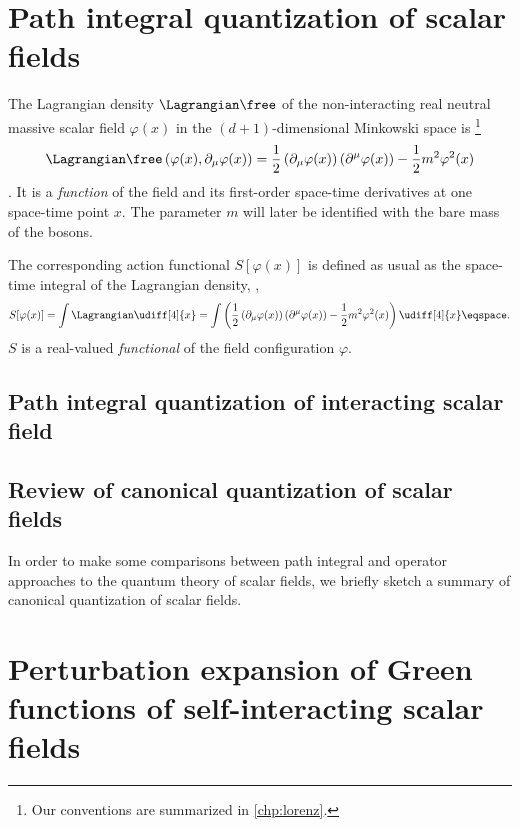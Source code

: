 \section{Path integral quantization of scalar fields}

The Lagrangian density $\Lagrangian\free$ of the non-interacting real neutral massive scalar field
$\varphi(x)$ in the $(d+1)$-dimensional Minkowski space is%
\footnote{Our conventions are summarized in \cref{chp:lorenz}.}
\begin{dmath}[label={L0scalar}]
   \Lagrangian\free \left( \varphi(x), \partial_{\mu}\varphi(x) \right) = \frac{1}{2} \left( \partial_{\mu} \varphi(x) \right) \left(
\partial^{\mu} \varphi(x) \right) - \frac{1}{2} m^{2} \varphi^{2}(x) 
\end{dmath}.
It is a \emph{function} of the field and its first-order space-time
derivatives at one space-time point $x$.
The parameter $m$ will later be identified with the bare mass of the bosons.

The corresponding action functional $S[\varphi(x)]$ is defined as usual as the space-time integral of the
Lagrangian density, \ie, 
\begin{equation}\label{eq:S}
S[\varphi(x)] = \int \Lagrangian \udiff[4]{x} = 
\int \left( \frac{1}{2} \left( \partial_{\mu} \varphi(x) \right) \left(
\partial^{\mu} \varphi(x) \right) - \frac{1}{2}m^{2} \varphi^{2}(x) \right)
\udiff[4]{x} \eqspace .
\end{equation}
$S$ is a real-valued \emph{functional} of the field configuration $\varphi$.



\subsection{Path integral quantization of interacting scalar field}
\subsection{Review of canonical quantization of scalar fields}

In order to make some comparisons between path integral and operator approaches
to the quantum theory of scalar fields, we briefly sketch a summary of canonical
quantization of scalar fields.


\section{Perturbation expansion of Green functions of self-interacting scalar fields}
